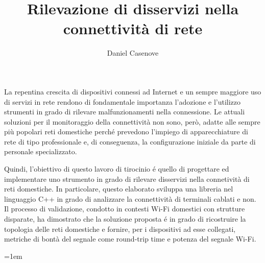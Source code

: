\documentclass[12pt,a4paper,twoside,openany]{book}
\author{Daniel Casenove}
\title{Rilevazione di disservizi nella connettività di rete}
\makeatletter
\newenvironment{abstract}%
	{\cleardoublepage%
		\thispagestyle{empty}%
		 \null \vfill\begin{center}%
			\bfseries \abstractname \end{center}}%
	{\vfill\null}
\newcommand{\fncyfront}{%
	\fancyhead[RO]{{\footnotesize\rightmark}} 
	\fancyfoot[RO]{\thepage} \fancyhead[LE]{\footnotesize{\leftmark}} 
	\fancyfoot[LE]{\thepage} 
	\fancyhead[RE,LO]{}
	\fancyfoot[C]{}
	\setlength{\headheight}{14.5pt}
\renewcommand{\headrulewidth}{0.3pt}}
\newcommand{\fncymain}{%
	\fancyhead[RO]{{\bfseries\footnotesize\rightmark}} 
	\fancyfoot[RO]{\bfseries\thepage} 
	\fancyhead[LE]{{\bfseries\footnotesize\leftmark}} 
	\fancyfoot[LE]{\bfseries\thepage}
	\fancyfoot[C]{} 
	\setlength{\headheight}{26pt}
\renewcommand{\headrulewidth}{2pt}}
\def\cleardoublepage{\clearpage\if@twoside \ifodd\c@page \else\hbox{}\thispagestyle{empty}\newpage
\if@twocolumn\hbox{}\newpage\fi\fi\fi} \makeatother
\makeatother
\begin{document}
\pagestyle{fancy}
\fncyfront
\frontmatter
\begin{frontespizio}
\Margini{2.5cm}{1.5cm}{2.5cm}{1cm}
  
\end{frontespizio}

\begin{abstract}
 
La repentina crescita di dispositivi connessi ad Internet e un sempre maggiore uso di servizi in rete rendono di fondamentale importanza l'adozione e l'utilizzo strumenti in grado di rilevare malfunzionamenti nella connessione.
Le attuali soluzioni per il monitoraggio della connettivit\`a non sono, per\`o, adatte alle sempre pi\`u popolari reti domestiche perch\'e prevedono l'impiego di apparecchiature di rete di tipo professionale e, di conseguenza, la configurazione iniziale da parte di personale specializzato.

Quindi, l'obiettivo di questo lavoro di tirocinio \'e quello di progettare ed implementare uno strumento in grado di rilevare disservizi nella connetivit\`a di reti domestiche.
In particolare, questo elaborato sviluppa una libreria nel linguaggio C++ in grado di analizzare la connettivit\`a di terminali cablati e non.
Il processo di validazione, condotto in contesti Wi-Fi domestici con strutture disparate, ha dimostrato che la soluzione proposta \'e in grado di ricostruire la topologia delle reti domestiche e fornire, per i dispositivi ad esse collegati, metriche di bont\`a del segnale come round-trip time e potenza del segnale Wi-Fi.

\end{abstract}

\cleardoublepage
{}

\tableofcontents
\fncymain
\mainmatter
{}








\emergencystretch=1em
\printbibliography[heading=bibintoc]
\begin{appendices}

\end{appendices}
\end{document}
